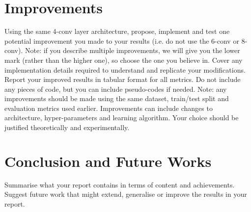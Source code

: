 \documentclass[conference]{IEEEtran}
\begin{document}
\section{Improvements}
Using the same 4-conv layer architecture, propose, implement and test one potential improvement you made to your results (i.e. do not use the 6-conv or 8-conv). Note: if you describe multiple improvements, we will give you the lower mark (rather than the higher one), so choose the one you believe in. Cover any implementation details required to understand and replicate your modifications. Report your improved results in tabular format for all metrics. Do not include any pieces of code, but you can include pseudo-codes if needed. Note: any improvements should be made using the same dataset, train/test split and evaluation metrics used earlier. Improvements can include changes to architecture, hyper-parameters and learning algorithm. Your choice should be justified theoretically and experimentally. 

\section{Conclusion and Future Works}
Summarise what your report contains in terms of content and achievements. 
Suggest future work that might extend, generalise or improve the results in your report. 





\end{document}
